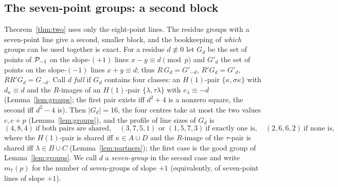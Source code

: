 \subsection*{The seven-point groups: a second block}

Theorem~\ref{thm:two} uses only the eight-point lines.  The residue groups with a seven-point line give a second, smaller block, and the
bookkeeping of \emph{which} groups can be used together is exact.  For a residue $d\not\equiv0$ let $G_d$ be the set of points of $\mathcal{P}_{-1}$
on the slope-$(+1)$ lines $x-y\equiv d\pmod p$ and $G'_d$ the set of points on the slope-$(-1)$ lines $x+y\equiv d$; thus
$R\,G_d=G'_{-d}$, $R'G_d=G'_d$, $RR'G_d=G_{-d}$.  Call $d$ \emph{full} if $G_d$ contains four classes: an $H(1)$-pair $\{\kappa,\sigma\kappa\}$
with $d_\kappa\equiv d$ and the $R$-images of an $H(1)$-pair $\{\lambda,\tau\lambda\}$ with $e_\lambda\equiv-d$ (Lemma~\ref{lem:groups}; the
first pair exists iff $d^2+4$ is a nonzero square, the second iff $d^2-4$ is).  Then $|G_d|=16$, the four centres take at most the two
values $c,c+p$ (Lemma~\ref{lem:groups}), and the profile of line sizes of $G_d$ is
\[
 (4,8,4)\ \text{if both pairs are shared},\quad (3,7,5,1)\text{ or }(1,5,7,3)\ \text{if exactly one is},\quad (2,6,6,2)\ \text{if none is},
\]
where the $H(1)$-pair is shared iff $\kappa\in A\cup D$ and the $R$-image of the $\tau$-pair is shared iff $\lambda\in B\cup C$
(Lemma~\ref{lem:partners}); the first case is the good group of Lemma~\ref{lem:groups}.  We call $d$ a \emph{seven-group} in the second
case and write $m_7(p)$ for the number of seven-groups of slope $+1$ (equivalently, of seven-point lines of slope $+1$).

